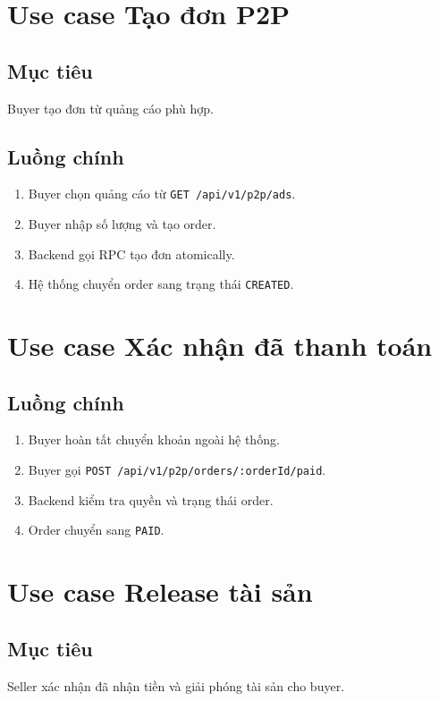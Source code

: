 \documentclass[a4paper,12pt]{report}
\begin{document}
\section{Use case Tạo đơn P2P}
\subsection{Mục tiêu}
Buyer tạo đơn từ quảng cáo phù hợp.

\subsection{Luồng chính}
\begin{enumerate}
    \item Buyer chọn quảng cáo từ \texttt{GET /api/v1/p2p/ads}.
    \item Buyer nhập số lượng và tạo order.
    \item Backend gọi RPC tạo đơn atomically.
    \item Hệ thống chuyển order sang trạng thái \texttt{CREATED}.
\end{enumerate}

\section{Use case Xác nhận đã thanh toán}
\subsection{Luồng chính}
\begin{enumerate}
    \item Buyer hoàn tất chuyển khoản ngoài hệ thống.
    \item Buyer gọi \texttt{POST /api/v1/p2p/orders/:orderId/paid}.
    \item Backend kiểm tra quyền và trạng thái order.
    \item Order chuyển sang \texttt{PAID}.
\end{enumerate}

\section{Use case Release tài sản}
\subsection{Mục tiêu}
Seller xác nhận đã nhận tiền và giải phóng tài sản cho buyer.
\end{document}
